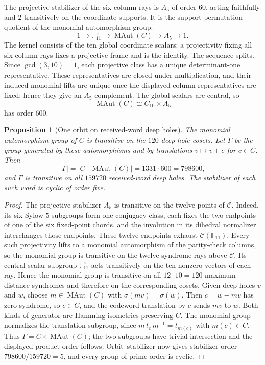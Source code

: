 \documentclass[11pt]{article}
\newtheorem{proposition}[theorem]{Proposition}
\theoremstyle{definition}
\theoremstyle{remark}
\newcommand{\F}{\mathbb{F}}
\newcommand{\cC}{\mathcal{C}}
\begin{document}
The projective stabilizer of the six column rays is $A_5$ of order $60$,
acting faithfully and $2$-transitively on the coordinate supports. It is
the support-permutation quotient of the monomial automorphism group:
\[
 1\longrightarrow\F_{11}^{\times}\longrightarrow
 \operatorname{MAut}(C)\longrightarrow A_5\longrightarrow1.
\]
The kernel consists of the ten global coordinate scalars: a projectivity
fixing all six column rays fixes a projective frame and is the identity.
The sequence splits. Since $\gcd(3,10)=1$, each projective class has a unique
determinant-one representative. These representatives are closed under
multiplication, and their induced monomial lifts are unique once the
displayed column representatives are fixed; hence they give an $A_5$
complement. The global scalars are central, so
\[
 \operatorname{MAut}(C)\cong C_{10}\times A_5
\]
has order $600$.

\begin{proposition}[One orbit on received-word deep holes]
\label{prop:deep-hole-orbit}
The monomial automorphism group of $C$ is transitive on the $120$ deep-hole
cosets. Let $\Gamma$ be the group generated by these automorphisms and by
translations $v\mapsto v+c$ for $c\in C$. Then
\[
 |\Gamma|=|C|\,|\operatorname{MAut}(C)|=1331\cdot600=798600,
\]
and $\Gamma$ is transitive on all $159720$ received-word deep holes. The
stabilizer of each such word is cyclic of order five.
\end{proposition}

\begin{proof}
The projective stabilizer $A_5$ is transitive on the twelve points of
$\cC$. Indeed, its six Sylow $5$-subgroups form one conjugacy class, each
fixes the two endpoints of one of the six fixed-point chords, and the involution in
its dihedral normalizer interchanges those endpoints. These twelve endpoints
exhaust $\cC(\F_{11})$. Every such
projectivity lifts to a monomial automorphism of the parity-check columns,
so the monomial group is transitive on the twelve syndrome rays above
$\cC$. Its central scalar subgroup $\F_{11}^{\times}$ acts transitively on
the ten nonzero vectors of each ray. Hence the monomial group is transitive
on all $12\cdot10=120$ maximum-distance syndromes and therefore on the
corresponding cosets. Given deep holes $v$ and $w$, choose
$m\in\operatorname{MAut}(C)$ with
$\sigma(mv)=\sigma(w)$. Then $c=w-mv$ has zero syndrome, so $c\in C$, and
the codeword translation by $c$ sends $mv$ to $w$. Both kinds of generator
are Hamming isometries preserving $C$. The monomial group normalizes the
translation subgroup, since $m\,t_c\,m^{-1}=t_{m(c)}$ with $m(c)\in C$.
Thus $\Gamma=C\rtimes\operatorname{MAut}(C)$; the two subgroups have trivial
intersection and the displayed product order follows. Orbit--stabilizer
now gives stabilizer order $798600/159720=5$, and every group of prime
order is cyclic.
\end{proof}
\end{document}
